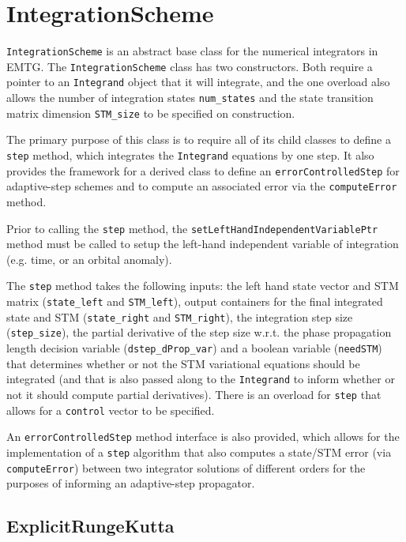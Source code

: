 \section{IntegrationScheme}
\label{sec:IntegrationScheme}

\texttt{IntegrationScheme} is an abstract base class for the numerical integrators in EMTG. The \texttt{IntegrationScheme} class has two constructors. Both require a pointer to an \texttt{Integrand} object that it will integrate, and the one overload also allows the number of integration states \texttt{num\_states} and the state transition matrix dimension \texttt{STM\_size} to be specified on construction.

The primary purpose of this class is to require all of its child classes to define a \texttt{step} method, which integrates the \texttt{Integrand} equations by one step. It also provides the framework for a derived class to define an \texttt{errorControlledStep} for adaptive-step schemes and to compute an associated error via the \texttt{computeError} method.

Prior to calling the \texttt{step} method, the \texttt{setLeftHandIndependentVariablePtr} method must be called to setup the left-hand independent variable of integration (e.g. time, or an orbital anomaly).

The \texttt{step} method takes the following inputs: the left hand state vector and STM matrix (\texttt{state\_left} and \texttt{STM\_left}), output containers for the final integrated state and STM (\texttt{state\_right} and \texttt{STM\_right}), the integration step size (\texttt{step\_size}), the partial derivative of the step size w.r.t. the phase propagation length decision variable (\texttt{dstep\_dProp\_var}) and a boolean variable (\texttt{needSTM}) that determines whether or not the STM variational equations should be integrated (and that is also passed along to the \texttt{Integrand} to inform whether or not it should compute partial derivatives). There is an overload for \texttt{step} that allows for a \texttt{control} vector to be specified.

An \texttt{errorControlledStep} method interface is also provided, which allows for the implementation of a \texttt{step} algorithm that also computes a state/STM error (via \texttt{computeError}) between two integrator solutions of different orders for the purposes of informing an adaptive-step propagator.

\subsection{ExplicitRungeKutta}
\label{sec:ExplicitRungeKutta}

